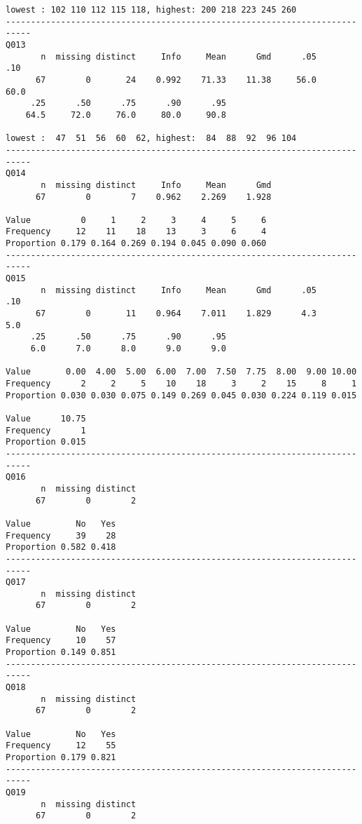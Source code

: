 \documentclass[]{article}
\begin{document}
\begin{verbatim}
lowest : 102 110 112 115 118, highest: 200 218 223 245 260
---------------------------------------------------------------------------
Q013 
       n  missing distinct     Info     Mean      Gmd      .05      .10 
      67        0       24    0.992    71.33    11.38     56.0     60.0 
     .25      .50      .75      .90      .95 
    64.5     72.0     76.0     80.0     90.8 

lowest :  47  51  56  60  62, highest:  84  88  92  96 104
---------------------------------------------------------------------------
Q014 
       n  missing distinct     Info     Mean      Gmd 
      67        0        7    0.962    2.269    1.928 
                                                    
Value          0     1     2     3     4     5     6
Frequency     12    11    18    13     3     6     4
Proportion 0.179 0.164 0.269 0.194 0.045 0.090 0.060
---------------------------------------------------------------------------
Q015 
       n  missing distinct     Info     Mean      Gmd      .05      .10 
      67        0       11    0.964    7.011    1.829      4.3      5.0 
     .25      .50      .75      .90      .95 
     6.0      7.0      8.0      9.0      9.0 
                                                                      
Value       0.00  4.00  5.00  6.00  7.00  7.50  7.75  8.00  9.00 10.00
Frequency      2     2     5    10    18     3     2    15     8     1
Proportion 0.030 0.030 0.075 0.149 0.269 0.045 0.030 0.224 0.119 0.015
                
Value      10.75
Frequency      1
Proportion 0.015
---------------------------------------------------------------------------
Q016 
       n  missing distinct 
      67        0        2 
                      
Value         No   Yes
Frequency     39    28
Proportion 0.582 0.418
---------------------------------------------------------------------------
Q017 
       n  missing distinct 
      67        0        2 
                      
Value         No   Yes
Frequency     10    57
Proportion 0.149 0.851
---------------------------------------------------------------------------
Q018 
       n  missing distinct 
      67        0        2 
                      
Value         No   Yes
Frequency     12    55
Proportion 0.179 0.821
---------------------------------------------------------------------------
Q019 
       n  missing distinct 
      67        0        2 
                      

\end{verbatim}
\end{document}
